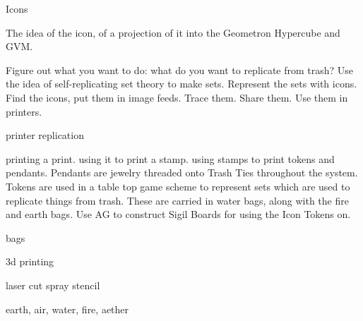 Icons

The idea of the icon, of a projection of it into the Geometron Hypercube and GVM.

Figure out what you want to do: what do you want to replicate from trash?  Use the idea of self-replicating set theory to make sets.  Represent the sets with icons.  Find the icons, put them in image feeds.  Trace them.  Share them.  Use them in printers.  

 printer replication

printing a print.  using it to print a stamp.  using stamps to print tokens and pendants.  Pendants are jewelry threaded onto Trash Ties throughout the system.  Tokens are used in a table top game scheme to represent sets which are used to replicate things from trash.  These are carried in water bags, along with the fire and earth bags.  Use AG to construct Sigil Boards for using the Icon Tokens on.

 bags

3d printing

laser cut spray stencil 

 earth, air, water, fire, aether